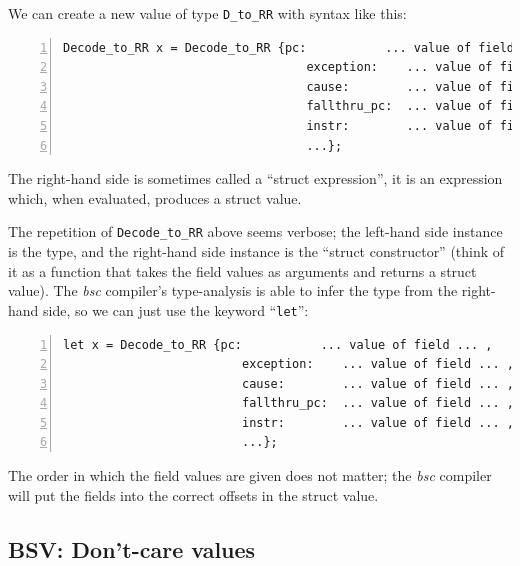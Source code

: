 We can create a new value of type \verb|D_to_RR| with syntax like
this:

{\small
\begin{Verbatim}[frame=single, numbers=left]
   Decode_to_RR x = Decode_to_RR {pc:           ... value of field ... ,
                                  exception:    ... value of field ... ,
                                  cause:        ... value of field ... ,
                                  fallthru_pc:  ... value of field ... ,
                                  instr:        ... value of field ... ,
                                  ...};
\end{Verbatim}
}

The right-hand side is sometimes called a ``struct expression'', {\ie}
it is an expression which, when evaluated, produces a struct value.

The repetition of \verb|Decode_to_RR| above seems verbose; the
left-hand side instance is the type, and the right-hand side instance
is the ``struct constructor'' (think of it as a function that takes
the field values as arguments and returns a struct value). The
\emph{bsc} compiler's type-analysis is able to infer the type from the
right-hand side, so we can just use the keyword ``\verb|let|'':


{\small
\begin{Verbatim}[frame=single, numbers=left]
   let x = Decode_to_RR {pc:           ... value of field ... ,
                         exception:    ... value of field ... ,
                         cause:        ... value of field ... ,
                         fallthru_pc:  ... value of field ... ,
                         instr:        ... value of field ... ,
                         ...};
\end{Verbatim}
}

The order in which the field values are given does not matter; the
\emph{bsc} compiler will put the fields into the correct offsets in
the struct value.


\subsection{BSV: Don't-care values} 

